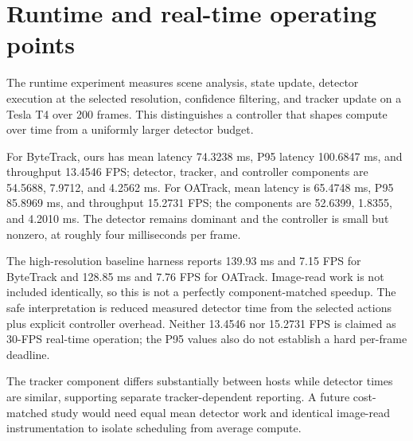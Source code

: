 \section{Runtime and real-time operating points}
The runtime experiment measures scene analysis, state update, detector execution
at the selected resolution, confidence filtering, and tracker update on a Tesla
T4 over 200 frames. This distinguishes a controller that shapes compute over
time from a uniformly larger detector budget.

For ByteTrack, ours has mean latency 74.3238 ms, P95 latency 100.6847 ms, and
throughput 13.4546 FPS; detector, tracker, and controller components are
54.5688, 7.9712, and 4.2562 ms. For OATrack, mean latency is 65.4748 ms, P95
85.8969 ms, and throughput 15.2731 FPS; the components are 52.6399, 1.8355,
and 4.2010 ms. The detector remains dominant and the controller is small but
nonzero, at roughly four milliseconds per frame.

The high-resolution baseline harness reports 139.93 ms and 7.15 FPS for
ByteTrack and 128.85 ms and 7.76 FPS for OATrack. Image-read work is not
included identically, so this is not a perfectly component-matched speedup.
The safe interpretation is reduced measured detector time from the selected
actions plus explicit controller overhead. Neither 13.4546 nor 15.2731 FPS is
claimed as 30-FPS real-time operation; the P95 values also do not establish a
hard per-frame deadline.

The tracker component differs substantially between hosts while detector times
are similar, supporting separate tracker-dependent reporting. A future
cost-matched study would need equal mean detector work and identical image-read
instrumentation to isolate scheduling from average compute.

